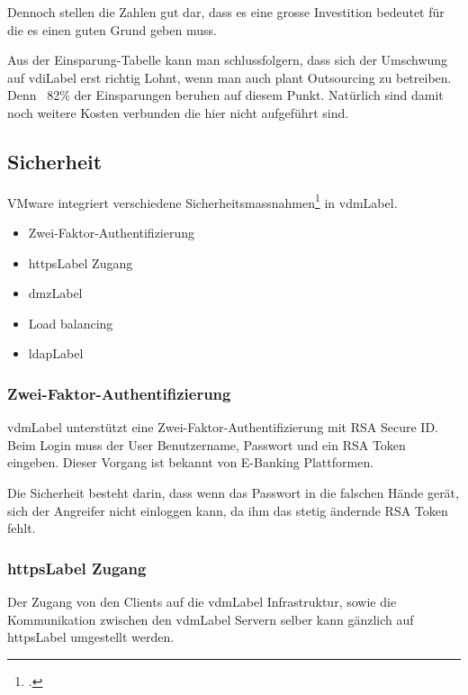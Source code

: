 Dennoch stellen die Zahlen gut dar, dass es eine grosse Investition bedeutet für die es einen guten Grund geben muss.

Aus der Einsparung-Tabelle kann man schlussfolgern, dass sich der Umschwung auf \Gls{vdiLabel} erst richtig Lohnt, wenn man auch plant Outsourcing zu betreiben. Denn ~82\% der Einsparungen beruhen auf diesem Punkt. Natürlich sind damit noch weitere Kosten verbunden die hier nicht aufgeführt sind.

\subsection{Sicherheit}
VMware integriert verschiedene Sicherheitsmassnahmen\footcite{Introduction_to_Virtual_Desktop_Manager} in \Gls{vdmLabel}.

\begin{itemize}
\item Zwei-Faktor-Authentifizierung
\item \Gls{httpsLabel} Zugang
\item \Gls{dmzLabel}
\item Load balancing
\item \Gls{ldapLabel}
\end{itemize}

\subsubsection{Zwei-Faktor-Authentifizierung}
\Gls{vdmLabel} unterstützt eine Zwei-Faktor-Authentifizierung mit RSA Secure ID. Beim Login muss der User Benutzername, Passwort und ein RSA Token eingeben. Dieser Vorgang ist bekannt von E-Banking Plattformen.

Die Sicherheit besteht darin, dass wenn das Passwort in die falschen Hände gerät, sich der Angreifer nicht einloggen kann, da ihm das stetig ändernde RSA Token fehlt.

\subsubsection{\Gls{httpsLabel} Zugang}
Der Zugang von den Clients auf die \Gls{vdmLabel} Infrastruktur, sowie die Kommunikation zwischen den \Gls{vdmLabel} Servern selber kann gänzlich auf \Gls{httpsLabel} umgestellt werden.

